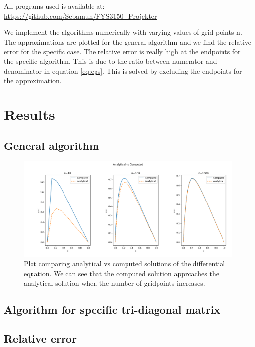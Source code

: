 \documentclass[norsk,a4paper,12pt]{article}
\begin{document}
All programs used is available at: \\
\url{https://github.com/Sebamun/FYS3150_Projekter}

We implement the algorithms numerically with varying values of grid points n. The approximations are plotted for the general algorithm and we find the relative error for the specific case. The relative error is really high at the endpoints for the specific algorithm. This is due to the ratio between numerator and denominator in equation \ref{eq:eps}. This is solved by excluding the endpoints for the approximation. 

\section{Results}

\subsection{General algorithm}

\begin{figure}[H]
	\centering
	\includegraphics[width=\linewidth]{1b.png}
	\caption{Plot comparing analytical vs computed solutions of the differential equation. We can see that the computed solution approaches the analytical solution when the number of gridpoints increases.}
	\label{fig:1bplot}
\end{figure}
\subsection{Algorithm for specific tri-diagonal matrix}



 \subsection{Relative error}
 
\end{document}
